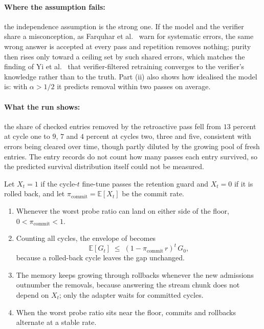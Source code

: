 \paragraph{Where the assumption fails:} the independence assumption is the strong one. If the model and the verifier share a misconception, as Farquhar et al.~\cite{farquhar2024semantic} warn for systematic errors, the same wrong answer is accepted at every pass and repetition removes nothing; purity then rises only toward a ceiling set by such shared errors, which matches the finding of Yi et al.~\cite{fu2025collapse} that verifier-filtered retraining converges to the verifier's knowledge rather than to the truth. Part (ii) also shows how idealised the model is: with $\alpha > 1/2$ it predicts removal within two passes on average.

\paragraph{What the run shows:} the share of checked entries removed by the retroactive pass fell from $13$ percent at cycle one to $9$, $7$ and $4$ percent at cycles two, three and five, consistent with errors being cleared over time, though partly diluted by the growing pool of fresh entries. The entry records do not count how many passes each entry survived, so the predicted survival distribution itself could not be measured.

\begin{heuristic}
\label{cor:stochastic-equilibrium}
Let $X_t = 1$ if the cycle-$t$ fine-tune passes the retention guard and $X_t = 0$ if it is rolled back, and let $\pi_{\text{commit}} = \mathbb{E}[X_t]$ be the commit rate.
\begin{enumerate}[label=(\roman*)]
    \item Whenever the worst probe ratio can land on either side of the floor, $0 < \pi_{\text{commit}} < 1$.
    \item Counting all cycles, the envelope of  becomes
    \begin{equation}
    \mathbb{E}[G_t] \;\le\; (1 - \pi_{\text{commit}}\, r)^{t} \, G_0,
    \label{eq:thm-stochastic-envelope}
    \end{equation}
    because a rolled-back cycle leaves the gap unchanged.
    \item The memory keeps growing through rollbacks whenever the new admissions outnumber the removals, because answering the stream chunk does not depend on $X_t$; only the adapter waits for committed cycles.
    \item When the worst probe ratio sits near the floor, commits and rollbacks alternate at a stable rate.
\end{enumerate}
\end{heuristic}

